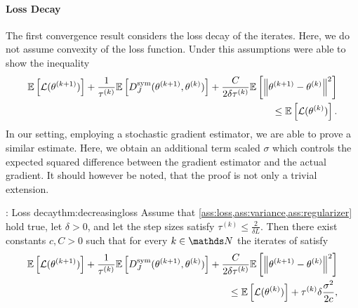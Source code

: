 \paragraph{Loss Decay}
The first convergence result considers the loss decay of the iterates. Here, we do not assume convexity of the loss function. Under this assumptions \cite{benning2018choose, benning2018modern} were able to show the inequality
%
\begin{align*}
	\begin{split}
		\mathbb{E}\left[\mathcal{L}(\theta^{(k+1)})\right] + \frac{1}{\tau^{(k)}}\mathbb{E}\left[ D^\mathrm{sym}_J(\theta^{(k+1)},\theta^{(k)})\right] + \frac{C}{2\delta\tau^{(k)}}\mathbb{E}\left[\left\|\theta^{(k+1)}-\theta^{(k)}\right\|^2\right] \\
		\leq \mathbb{E}\left[\mathcal{L}(\theta^{(k)})\right].
	\end{split}
\end{align*}
%
%
In our setting, employing a stochastic gradient estimator, we are able to prove a similar estimate. Here, we obtain an additional term scaled $\sigma$ which controls the expected squared difference between the gradient estimator and the actual gradient. It should however be noted, that the proof is not only a trivial extension.
%
%
\begin{theorem}{\cite[Th. 2]{bungert2022bregman}: Loss decay}{thm:decreasingloss}
	Assume that \cref{ass:loss,ass:variance,ass:regularizer} hold true, let $\delta>0$, and let the step sizes satisfy $\tau^{(k)} \leq \frac{2}{\delta L}$.
	Then there exist constants $c,C>0$ such that for every $k\in\N$ the iterates of  satisfy 
	\begin{align}\label{ineq:loss_decay}
		\begin{split}
			\mathbb{E}\left[\mathcal{L}(\theta^{(k+1)})\right] + \frac{1}{\tau^{(k)}}\mathbb{E}\left[ D^\mathrm{sym}_J(\theta^{(k+1)},\theta^{(k)})\right] + \frac{C}{2\delta\tau^{(k)}}\mathbb{E}\left[\left\|\theta^{(k+1)}-\theta^{(k)}\right\|^2\right] \\
			\leq \mathbb{E}\left[\mathcal{L}(\theta^{(k)})\right] + \tau^{(k)}\delta\frac{\sigma^2}{2c},
		\end{split}
	\end{align}
\end{theorem}


